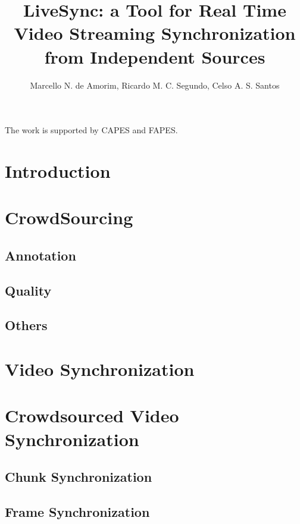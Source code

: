 \documentclass[jidm,a4paper]{jidm} %
\title{LiveSync: a Tool for Real Time Video Streaming Synchronization from Independent Sources}
\author{Marcello N. de Amorim\inst{1}, Ricardo M. C. Segundo\inst{2}, Celso A. S. Santos\inst{3}}
\institute{Universidade Federal do Espirito Santo, Brazil  \\ \email{novaes@inf.ufes.br , rmcs87@gmail.com , seibel@inf.ufes.br}
}
\begin{document}
\begin{bottomstuff}
The work is supported by CAPES and FAPES.
\end{bottomstuff}

\maketitle

\section{Introduction}


\section{CrowdSourcing}


\subsection{Annotation}


\subsection{Quality}


\subsection{Others}


\section{Video Synchronization}


\section{Crowdsourced Video Synchronization}


\subsection{Chunk Synchronization}


\subsection{Frame Synchronization}

\end{document}
